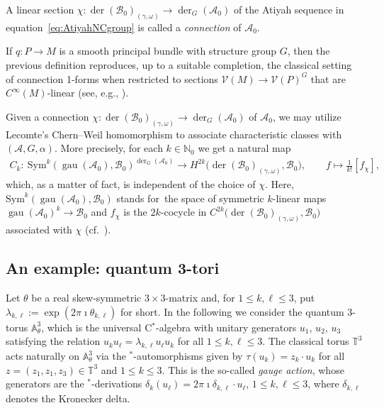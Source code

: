 \documentclass[pdftex]{sigma}
\numberwithin{equation}{section}
\DeclareMathOperator{\der}{der}
\DeclareMathOperator{\gau}{gau}
\newcommand*{\Star}{$^*$\nobreakdash}
\newcommand*{\alg}{\mathcal}		%
\newcommand*{\aA}{\alg{A}}			%
\newcommand*{\aB}{\alg{B}} 			%
\begin{document}
\begin{Definition}\label{def:connection}
A linear section $\chi\colon \der(\aB_0)_{(\gamma,\omega)} \to \der_G(\aA_0)$ of the Atiyah sequence in equation~\eqref{eq:AtiyahNCgroup} is called a \emph{connection} of $\aA_0$.
\end{Definition}

\begin{Remark}
If $q\colon P \to M$ is a smooth principal bundle with structure group $G$, then the previous definition reproduces, up to a suitable completion, the classical setting of connection 1-forms when restricted to sections $\mathcal{V}(M) \to \mathcal{V}(P)^G$ that are $C^\infty(M)$-linear (see, e.g., \cite[Chapter~XII]{Kob69II}).
\end{Remark}

Given a connection $\chi\colon \der(\aB_0)_{(\gamma,\omega)} \to \der_G(\aA_0)$ of $\aA_0$, we may utilize Lecomte's Chern--Weil homomorphism to associate characteristic classes with $(\aA,G,\alpha)$.
More precisely, for each $k \in\mathbb{N}_0$ we get a natural map
\begin{gather*}
	C_k \colon \ \text{Sym}^k(\gau(\aA_0),\aB_0)^{\der_G(\aA_0)}\rightarrow H^{2k}\big( \der(\aB_0)_{(\gamma,\omega)},\aB_0\big), \qquad f \mapsto \frac{1}{k!}[f_\chi],
\end{gather*}
which, as a matter of fact, is independent of the choice of $\chi$.
Here, $\text{Sym}^k(\gau(\aA_0),\aB_0)$ stands for~the space of symmetric $k$-linear maps $\gau(\aA_0)^k \to \aB_0$ and $f_\chi$ is the $2k$-cocycle in \linebreak $C^{2k}\big(\der(\aB_0)_{(\gamma,\omega)},\aB_0\big)$ associated with $\chi$ (cf.~\cite{Lec85,Wa18}).

\subsection{An example: quantum 3-tori}\label{sec:Q3T}

Let $\theta$ be a real skew-symmetric $3\times 3$-matrix and, for $1 \le k, \ell \le 3$, put $\lambda_{k,\ell} := \exp(2\pi \imath \theta_{k,\ell})$ for short.
In the following we consider the quantum 3-torus $\mathbb A^3_\theta$, which is the universal C\Star-algebra with unitary generators $u_1$, $u_2$, $u_3$ satisfying the relation $u_k u_\ell = \lambda_{k,\ell} u_\ell u_k$ for all $1 \le k,\ell \le 3$.
The classical torus $\mathbb T^3$ acts naturally on $\mathbb A^3_\theta$ via the \Star-automorphisms given by $\tau(u_k) = z_k \cdot u_k$ for all $z = (z_1,z_1,z_3) \in \mathbb T^3$ and $1 \le k \le 3$.
This is the so-called \emph{gauge action}, whose generators are the \Star-derivations $\delta_k(u_\ell) = 2 \pi \imath \delta_{k, \ell} \cdot u_\ell$, $1 \le k,\ell \le 3$, where $\delta_{k,\ell}$ denotes the Kronecker delta.
\end{document}
